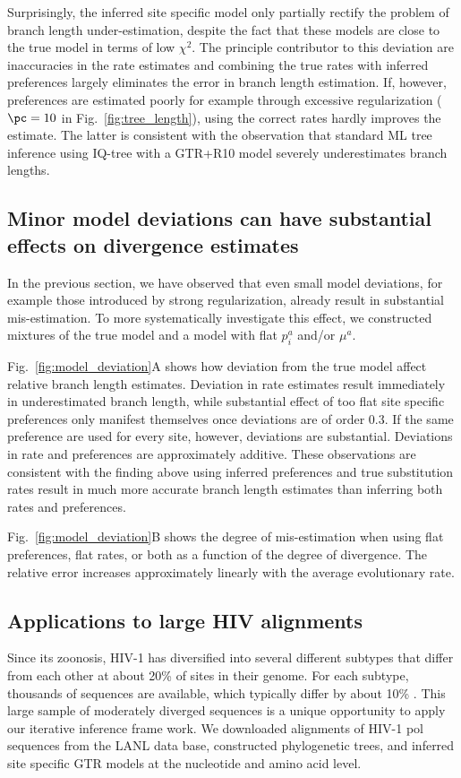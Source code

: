\documentclass[aps,rmp,twocolumn]{revtex4}
\newcommand{\eqp}{p}
\begin{document}
Surprisingly, the inferred site specific model only partially rectify the problem of branch length under-estimation, despite the fact that these models are close to the true model in terms of low $\chi^2$.
The principle contributor to this deviation are inaccuracies in the rate estimates and combining the true rates with inferred preferences largely eliminates the error in branch length estimation.
If, however, preferences are estimated poorly for example through excessive regularization ($\pc=10$ in Fig.~\ref{fig:tree_length}), using the correct rates hardly improves the estimate.
The latter is consistent with the observation that standard ML tree inference using IQ-tree with a GTR+R10 model severely underestimates branch lengths.

\subsection*{Minor model deviations can have substantial effects on divergence estimates}
In the previous section, we have observed that even small model deviations, for example those introduced by strong regularization, already result in substantial mis-estimation.
To more systematically investigate this effect, we constructed mixtures of the true model and a model with flat $\eqp_i^a$ and/or $\mu^a$.

Fig.~\ref{fig:model_deviation}A shows how deviation from the true model affect relative branch length estimates.
Deviation in rate estimates result immediately in underestimated branch length, while substantial effect of too flat site specific preferences only manifest themselves once deviations are of order 0.3.
If the same preference are used for every site, however, deviations are substantial.
Deviations in rate and preferences are approximately additive.
These observations are consistent with the finding above using inferred preferences and true substitution rates result in much more accurate branch length estimates than inferring both rates and preferences.

Fig.~\ref{fig:model_deviation}B shows the degree of mis-estimation when using flat preferences, flat rates, or both as a function of the degree of divergence.
The relative error increases approximately linearly with the average evolutionary rate.


\subsection*{Applications to large HIV alignments}
Since its zoonosis, HIV-1 has diversified into several different subtypes that differ from each other at about 20\% of sites in their genome.
For each subtype, thousands of sequences are available, which typically differ by about 10\% \citep{LANL}.
This large sample of moderately diverged sequences is a unique opportunity to apply our iterative inference frame work.
We downloaded alignments of HIV-1 pol sequences from the LANL data base, constructed phylogenetic trees, and inferred site specific GTR models at the nucleotide and amino acid level.
\end{document}
